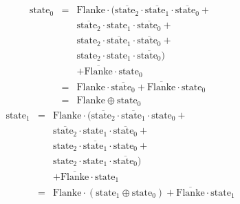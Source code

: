 \documentclass[DIN, pagenumber=false, fontsize=11pt, parskip=half]{scrartcl}
\begin{document}
\begin{enumerate}[label=(\alph*)]
\begin{eqnarray*}
                \text{state}_0 &=& \text{Flanke} \cdot (\overline{\text{state}_2} \cdot \overline{\text{state}_1} \cdot \overline{\text{state}_0} + \\
                            && \overline{\text{state}_2} \cdot \text{state}_1 \cdot \overline{\text{state}_0} + \\
                            && \text{state}_2 \cdot \overline{\text{state}_1} \cdot \overline{\text{state}_0} + \\
                            && \text{state}_2 \cdot \text{state}_1 \cdot \overline{\text{state}_0}) \\
                            && + \overline{\text{Flanke}} \cdot \text{state}_0\\
                            &=& \text{Flanke} \cdot \overline{\text{state}_0} +\overline{\text{Flanke}} \cdot \text{state}_0 \\
                            &=& \text{Flanke} \oplus \text{state}_0
            \end{eqnarray*}
            \begin{eqnarray*}
                \text{state}_1 &=& \text{Flanke} \cdot (\overline{\text{state}_2} \cdot \overline{\text{state}_1} \cdot \text{state}_0 + \\
                            && \overline{\text{state}_2} \cdot \text{state}_1 \cdot \overline{\text{state}_0} +\\
                            && \text{state}_2 \cdot \overline{\text{state}_1} \cdot \text{state}_0 +\\
                            && \text{state}_2 \cdot \text{state}_1 \cdot \overline{\text{state}_0}) \\
                            && + \overline{\text{Flanke}} \cdot \text{state}_1 \\
                            &=& \text{Flanke} \cdot (\text{state}_1 \oplus \text{state}_0) + \overline{\text{Flanke}} \cdot \text{state}_1
            \end{eqnarray*}


\end{enumerate}
\end{document}
